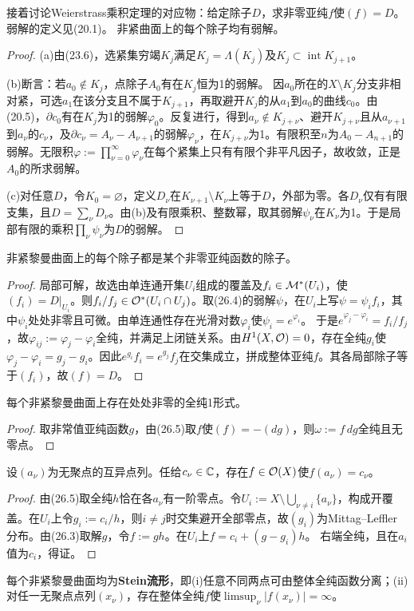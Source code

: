 接着讨论Weierstrass乘积定理的对应物：给定除子$D$，求非零亚纯$f$使$(f)=D$。弱解的定义见(20.1)。
非紧曲面上的每个除子均有弱解。
\begin{proof}
(a)由(23.6)，选紧集穷竭$K_j$满足$K_j=\Lambda(K_j)$及$K_j\subset\operatorname{int}K_{j+1}$。

(b)断言：若$a_0\notin K_j$，点除子$A_0$有在$K_j$恒为1的弱解。
因$a_0$所在的$X\setminus K_j$分支非相对紧，可选$a_1$在该分支且不属于$K_{j+1}$，再取避开$K_j$的从$a_1$到$a_0$的曲线$c_0$。由(20.5)，$\partial c_0$有在$K_j$为1的弱解$\varphi_0$。反复进行，得到$a_\nu\notin K_{j+\nu}$、避开$K_{j+\nu}$且从$a_{\nu+1}$到$a_\nu$的$c_\nu$，及$\partial c_\nu=A_\nu-A_{\nu+1}$的弱解$\varphi_\nu$，在$K_{j+\nu}$为1。有限积至$n$为$A_0-A_{n+1}$的弱解。无限积$\varphi:=\prod_{\nu=0}^\infty\varphi_\nu$在每个紧集上只有有限个非平凡因子，故收敛，正是$A_0$的所求弱解。

(c)对任意$D$，令$K_0=\varnothing$，定义$D_\nu$在$K_{\nu+1}\setminus K_\nu$上等于$D$，外部为零。各$D_\nu$仅有有限支集，且$D=\sum_\nu D_\nu$。由(b)及有限乘积、整数幂，取其弱解$\psi_\nu$在$K_\nu$为1。于是局部有限的乘积$\prod_\nu\psi_\nu$为$D$的弱解。
\end{proof}
非紧黎曼曲面上的每个除子都是某个非零亚纯函数的除子。
\begin{proof}
局部可解，故选由单连通开集$U_i$组成的覆盖及$f_i\in\mathcal M^*(U_i)$，使$(f_i)=D|_{U_i}$。则$f_i/f_j\in\mathcal O^*(U_i\cap U_j)$。取(26.4)的弱解$\psi$，在$U_i$上写$\psi=\psi_i f_i$，其中$\psi_i$处处非零且可微。由单连通性存在光滑对数$\varphi_i$使$\psi_i=e^{\varphi_i}$。
于是$e^{\varphi_j-\varphi_i}=f_i/f_j$，故$\varphi_{ij}:=\varphi_j-\varphi_i$全纯，并满足上闭链关系。由$H^1(X,\mathcal O)=0$，存在全纯$g_i$使$\varphi_j-\varphi_i=g_j-g_i$。因此$e^{g_i}f_i=e^{g_j}f_j$在交集成立，拼成整体亚纯$f$。其各局部除子等于$(f_i)$，故$(f)=D$。
\end{proof}
每个非紧黎曼曲面上存在处处非零的全纯1形式。
\begin{proof}
取非常值亚纯函数$g$，由(26.5)取$f$使$(f)=-(dg)$，则$\omega:=f\,dg$全纯且无零点。
\end{proof}
设$(a_\nu)$为无聚点的互异点列。任给$c_\nu\in\mathbb C$，存在$f\in\mathcal O(X)$使$f(a_\nu)=c_\nu$。
\begin{proof}
由(26.5)取全纯$h$恰在各$a_\nu$有一阶零点。令$U_i:=X\setminus\bigcup_{\nu\ne i}\{a_\nu\}$，构成开覆盖。在$U_i$上令$g_i:=c_i/h$，则$i\ne j$时交集避开全部零点，故$(g_i)$为Mittag--Leffler分布。由(26.3)取解$g$，令$f:=gh$。在$U_i$上$f=c_i+(g-g_i)h$。
右端全纯，且在$a_i$值为$c_i$，得证。
\end{proof}
每个非紧黎曼曲面均为\textbf{Stein流形}，即(i)任意不同两点可由整体全纯函数分离；(ii)对任一无聚点点列$(x_\nu)$，存在整体全纯$f$使$\limsup_\nu|f(x_\nu)|=\infty$。

